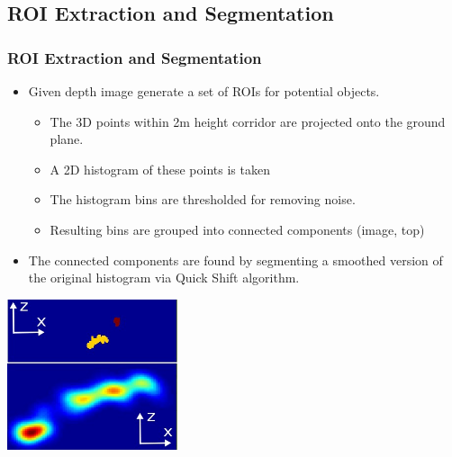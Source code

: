 \documentclass{beamer}
\begin{document}
\subsection{ROI Extraction and Segmentation}
\begin{frame}
\frametitle{ROI Extraction and Segmentation} 

\begin{itemize}
  \item Given depth image generate a set of ROIs for potential objects.
  \begin{itemize}
  	\item The 3D points within 2m height corridor are projected onto the ground plane.
  	\item A 2D histogram of these points is taken
  	\item The histogram bins are thresholded for removing noise.
  	\item Resulting bins are grouped into connected components (image, top)
  \end{itemize}
  \item The connected components are found by segmenting a smoothed version of the original histogram via Quick Shift algorithm.  
\end{itemize}
	\begin{center}
  \includegraphics[width=5cm]{histogram.jpg}
  \end{center}
\end{frame}

\end{document}
